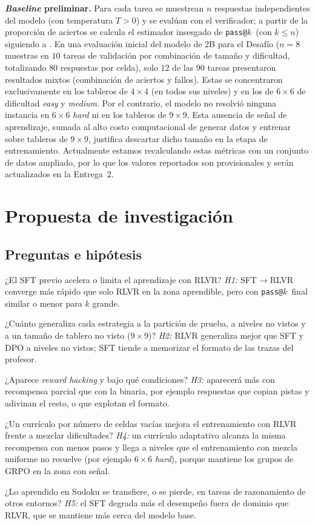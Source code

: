 \documentclass[letterpaper,11pt]{article}
\makeatletter
\newcommand{\passk}{\texttt{pass@}\ensuremath{k}}
\makeatother
\begin{document}
\textbf{\emph{Baseline} preliminar.} Para cada tarea se muestrean $n$ respuestas independientes del modelo (con temperatura $T > 0$) y se evalúan con el verificador; a partir de la proporción de aciertos se calcula el estimador insesgado de \passk\ (con $k \le n$) siguiendo a \citet{chen2021codex}. En una evaluación inicial del modelo de 2B para el Desafío ($n=8$ muestras en $10$ tareas de validación por combinación de tamaño y dificultad, totalizando $80$ respuestas por celda), solo $12$ de las $90$ tareas presentaron resultados mixtos (combinación de aciertos y fallos). Estas se concentraron exclusivamente en los tableros de $4\times4$ (en todos sus niveles) y en los de $6\times6$ de dificultad \emph{easy} y \emph{medium}. Por el contrario, el modelo no resolvió ninguna instancia en $6\times6$ \emph{hard} ni en los tableros de $9\times9$. Esta ausencia de señal de aprendizaje, sumada al alto costo computacional de generar datos y entrenar sobre tableros de $9\times9$, justifica descartar dicho tamaño en la etapa de entrenamiento. Actualmente estamos recalculando estas métricas con un conjunto de datos ampliado, por lo que los valores reportados son provisionales y serán actualizados en la Entrega~2.

\section{Propuesta de investigación}\label{sec:diseno}
\subsection{Preguntas e hipótesis}
\begin{description}[leftmargin=0pt]
  \item[P1.] ¿El SFT previo acelera o limita el aprendizaje con RLVR? \emph{H1:} SFT$\to$RLVR converge más rápido que solo RLVR en la zona aprendible, pero con \passk\ final similar o menor para $k$ grande.
  \item[P2.] ¿Cuánto generaliza cada estrategia a la partición de prueba, a niveles no vistos y a un tamaño de tablero no visto ($9\times9$)? \emph{H2:} RLVR generaliza mejor que SFT y DPO a niveles no vistos; SFT tiende a memorizar el formato de las trazas del profesor.
  \item[P3.] ¿Aparece \emph{reward hacking} y bajo qué condiciones? \emph{H3:} aparecerá más con recompensa parcial que con la binaria, por ejemplo respuestas que copian pistas y adivinan el resto, o que explotan el formato.
  \item[P4.] ¿Un currículo por número de celdas vacías mejora el entrenamiento con RLVR frente a mezclar dificultades? \emph{H4:} un currículo adaptativo alcanza la misma recompensa con menos pasos y llega a niveles que el entrenamiento con mezcla uniforme no resuelve (por ejemplo $6\times6$ \emph{hard}), porque mantiene los grupos de GRPO en la zona con señal.
  \item[P5.] ¿Lo aprendido en Sudoku se transfiere, o se pierde, en tareas de razonamiento de otros entornos? \emph{H5:} el SFT degrada más el desempeño fuera de dominio que RLVR, que se mantiene más cerca del modelo base.
\end{description}
\end{document}

